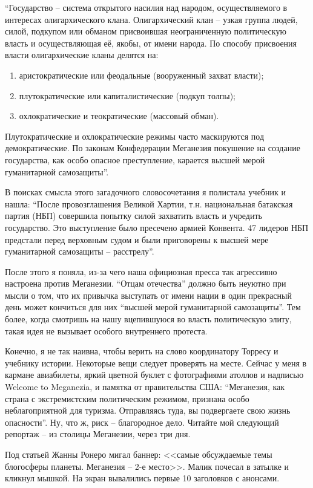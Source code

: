\begin{displayquote}
``Государство -- система открытого насилия над народом, осуществляемого в интересах олигархического клана. Олигархический клан -- узкая группа людей, силой, подкупом или обманом присвоившая неограниченную политическую власть и осуществляющая её, якобы, от имени народа. По способу присвоения власти олигархические кланы делятся на:
\begin{enumerate}
  \item аристократические или феодальные (вооруженный захват власти);
  \item плутократические или капиталистические (подкуп толпы);
  \item охлократические и теократические (массовый обман).
\end{enumerate}
Плутократические и охлократические режимы часто маскируются под демократические. По законам Конфедерации Меганезия покушение на создание государства, как особо опасное преступление, карается высшей мерой гуманитарной самозащиты''.
 
В поисках смысла этого загадочного словосочетания я полистала учебник и нашла: ``После провозглашения Великой Хартии, т.н. национальная батакская партия (НБП) совершила попытку силой захватить власть и учредить государство. Это выступление было пресечено армией Конвента. 47 лидеров НБП предстали перед верховным судом и были приговорены к высшей мере гуманитарной самозащиты -- расстрелу''.

После этого я поняла, из-за чего наша официозная пресса так агрессивно настроена против Меганезии. ``Отцам отечества'' должно быть неуютно при мысли о том, что их привычка выступать от имени нации в один прекрасный день может кончиться для них ``высшей мерой гуманитарной самозащиты''. Тем более, когда смотришь на нашу вцепившуюся во власть политическую элиту, такая идея не вызывает особого внутреннего протеста.

Конечно, я не так наивна, чтобы верить на слово координатору Торресу и учебнику истории. Некоторые вещи следует проверять на месте. Сейчас у меня в кармане авиабилеты, яркий цветной буклет с фотографиями атоллов и надписью Welcome to Meganezia, и памятка от правительства США: ``Меганезия, как страна с экстремистским политическим режимом, признана особо неблагоприятной для туризма. Отправляясь туда, вы подвергаете свою жизнь опасности''. Ну, что ж, риск -- благородное дело. Читайте мой следующий репортаж -- из столицы Меганезии, через три дня.
\end{displayquote}

Под статьей Жанны Ронеро мигал баннер: <<самые обсуждаемые темы блогосферы планеты. Меганезия -- 2-е место>>. Малик почесал в затылке и кликнул мышкой. На экран вывалились первые 10 заголовков с анонсами.

